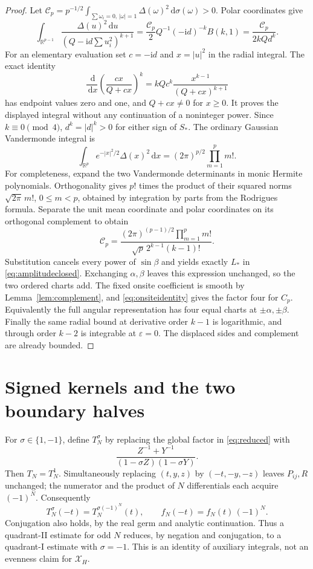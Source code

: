 \documentclass[11pt]{article}
\numberwithin{equation}{section}
\theoremstyle{definition}
\newcommand{\dd}{\,\mathrm d}
\newcommand{\ii}{\mathrm i}
\newcommand{\R}{\mathbb R}
\newcommand{\eps}{\varepsilon}
\begin{document}
\begin{proof}
Let $\mathscr C_p=p^{-1/2}\int_{\sum\omega_i=0,\,|\omega|=1}
\Delta(\omega)^2\dd\sigma(\omega)>0$. Polar coordinates give
\[
 \int_{\R^{p-1}}\frac{\Delta(u)^2\dd u}
 {(Q-\ii d\sum u_i^2)^{k+1}}
 =\frac{\mathscr C_p}{2}Q^{-1}(-\ii d)^{-k}B(k,1)
 =\frac{\mathscr C_p}{2kQd^k}.
\]
For an elementary evaluation set $c=-\ii d$ and $x=|u|^2$ in
the radial integral. The exact identity
\[
 \frac{\dd}{\dd x}\left(\frac{cx}{Q+cx}\right)^k
 =kQc^k\frac{x^{k-1}}{(Q+cx)^{k+1}}
\]
has endpoint values zero and one, and $Q+cx\ne0$ for $x\ge0$.
It proves the displayed integral without any continuation of
a noninteger power. Since $k\equiv0\pmod4$,
$d^k=|d|^k>0$ for either sign of $S_*$. The ordinary Gaussian
Vandermonde integral is
\[
 \int_{\R^p}e^{-|x|^2/2}\Delta(x)^2\dd x
 =(2\pi)^{p/2}\prod_{m=1}^p m!.
\]
For completeness, expand the two Vandermonde determinants in monic
Hermite polynomials. Orthogonality gives $p!$ times the product of
their squared norms $\sqrt{2\pi}\,m!$, $0\le m<p$, obtained by
integration by parts from the Rodrigues formula. Separate the unit
mean coordinate and polar coordinates on its orthogonal complement
to obtain
\[
 \mathscr C_p=
 \frac{(2\pi)^{(p-1)/2}\prod_{m=1}^p m!}
 {\sqrt p\,2^{k-1}(k-1)!}.
\]
Substitution cancels every power of $\sin\beta$ and yields exactly
$L_*$ in \eqref{eq:amplitudeclosed}. Exchanging $\alpha,\beta$
leaves this expression unchanged, so the two ordered charts add.
The fixed onsite coefficient is smooth by Lemma~\ref{lem:complement},
and \eqref{eq:onsiteidentity} gives the factor four for $C_p$.
Equivalently the full angular representation has four equal charts
at $\pm\alpha,\pm\beta$. Finally the same radial bound at derivative
order $k-1$ is logarithmic, and through order $k-2$ is integrable
at $\eps=0$. The displaced sides and complement are already bounded.
\end{proof}

\section{Signed kernels and the two boundary halves}\label{sec:signs}
For $\sigma\in\{1,-1\}$, define $T_N^\sigma$ by replacing
the global factor in \eqref{eq:reduced} with
\[
 \frac{Z^{-1}+Y^{-1}}{(1-\sigma Z)(1-\sigma Y)}.
\]
Then $T_N=T_N^1$. Simultaneously replacing
$(t,y,z)$ by $(-t,-y,-z)$ leaves $P_{ij},R$ unchanged;
the numerator and the product of $N$ differentials each acquire
$(-1)^N$. Consequently
\begin{equation}
 T_N^\sigma(-t)=T_N^{\sigma(-1)^N}(t),
 \qquad f_N(-t)=f_N(t)\,(-1)^N.
 \label{eq:signidentity}
\end{equation}
Conjugation also holds, by the real germ and analytic continuation.
Thus a quadrant-II estimate for odd $N$ reduces, by negation and
conjugation, to a quadrant-I estimate with $\sigma=-1$. This is
an identity of auxiliary integrals, not an evenness claim for
$\mathcal X_H$.
\end{document}
